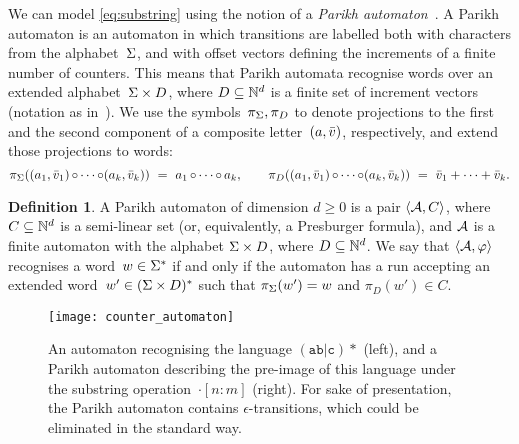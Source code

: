 \documentclass[acmsmall,review,anonymous,screen]{acmart}\settopmatter{printfolios=true,printccs=false,printacmref=true}
\theoremstyle{definition}
\newtheorem{definition}{Definition}[section]
\begin{document}
We can model \eqref{eq:substring} using the notion of a \emph{Parikh
  automaton}~\cite{parikh-automata,expressiveness}. A Parikh automaton
is an automaton in which transitions are labelled both with characters
from the alphabet~$\Sigma$, and with offset vectors defining the
increments of a finite number of counters. This means that Parikh
automata recognise words over an extended
alphabet~$\Sigma \times D$, where $D \subseteq \mathbb{N}^d$ is a
finite set of increment vectors (notation as
in~\cite{expressiveness}). We use the symbols~$\pi_\Sigma, \pi_D$
to denote projections to the first and the second component of a
composite letter~$(a, \bar{v})$, respectively, and extend those
projections to words:
\begin{equation*}
  \pi_\Sigma((a_1, \bar{v}_1) \operatorname{\circ} \cdots \operatorname{\circ} (a_k, \bar{v}_k))
  ~=~ a_1 \operatorname{\circ} \cdots \operatorname{\circ} a_k,
  \qquad
  \pi_D((a_1, \bar{v}_1) \operatorname{\circ} \cdots \operatorname{\circ} (a_k, \bar{v}_k))
  ~=~ \bar{v}_1 + \cdots + \bar{v}_k.
\end{equation*}

\begin{definition}\label{def:parikh-automata} A Parikh automaton of dimension $d
  \geq 0$ is a pair $\left\langle\mathcal{A}, C\right\rangle$, where
  $C \subseteq \mathbb{N}^d$ is a semi-linear set (or, equivalently, a
  Presburger formula), and $\mathcal{A}$ is a finite automaton with the
  alphabet $\Sigma \times D$, where $D \subseteq \mathbb{N}^d$. We
  say that $\left\langle\mathcal{A}, \varphi\right\rangle$ recognises a
  word~$w \in \Sigma^*$ if and only if the automaton has a run
  accepting an extended word~$w' \in (\Sigma \times D)^*$ such that
  $\pi_\Sigma(w') = w$ and $\pi_D(w') \in C$.
\end{definition}

    
\begin{figure}[t]
  \centering
  \hfill
  \texttt{[image: counter\_automaton]}
  \caption{An automaton recognising the language $\mathtt{(ab|c)*}$
    (left), and a Parikh automaton describing the pre-image of this
    language under the substring operation~$\cdot[n:m]$ (right). For
    sake of presentation, the Parikh automaton contains
    $\epsilon$-transitions, which could be eliminated in the standard
    way.}\label{fig:parikh-automata}
    \end{figure}
\end{document}
